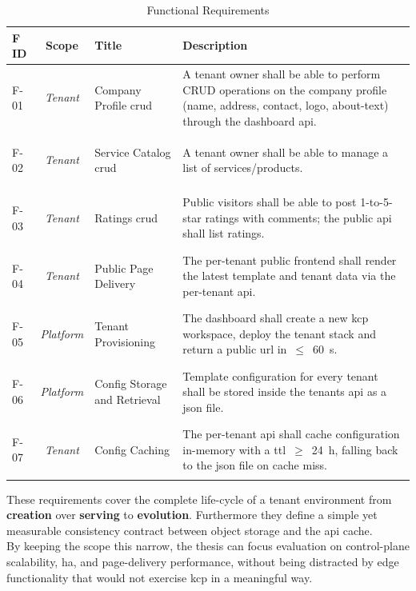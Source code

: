 \documentclass[11pt, a4paper, oneside, listof=totoc]{scrartcl}
\begin{document}
                \begin{table}[H]\label{tab:fr}
                    \centering
                    \renewcommand{\arraystretch}{1.5}
                    \begin{tabular}{lcp{4cm}P{8cm}}
                        \toprule
                        F ID & Scope & Title & Description \\
                        \midrule
                        \hypertarget{f1}{F-01} & \textit{Tenant} & Company Profile \gls{crud} & A tenant owner shall be able to perform CRUD operations on the company profile (name, address, contact, logo, about-text) through the dashboard \gls{api}. \\
                        \hypertarget{f2}{F-02} & \textit{Tenant} & Service Catalog \gls{crud} & A tenant owner shall be able to manage a list of services/products. \\
                        \hypertarget{f3}{F-03} & \textit{Tenant} & Ratings \gls{crud} & Public visitors shall be able to post 1-to-5-star ratings with comments; the public \gls{api} shall list ratings. \\
                        \hypertarget{f4}{F-04} & \textit{Tenant} & Public Page Delivery & The per-tenant public frontend shall render the latest template and tenant data via the per-tenant \gls{api}. \\
                        \hypertarget{f5}{F-05} & \textit{Platform} & Tenant Provisioning & The dashboard shall create a new \gls{kcp} workspace, deploy the tenant stack and return a public \gls{url} in~$\leq$~60~s. \\
                        \hypertarget{f6}{F-06} & \textit{Platform} & Config Storage and Retrieval & Template configuration for every tenant shall be stored inside the tenants \gls{api} as a \gls{json} file. \\
                        \hypertarget{f7}{F-07} & \textit{Tenant} & Config Caching & The per-tenant \gls{api} shall cache configuration in-memory with a \gls{ttl}~$\geq$~24~h, falling back to the \gls{json} file on cache miss. \\
                        \bottomrule
                    \end{tabular}
                    \caption{Functional Requirements}
                \end{table}

                These requirements cover the complete life-cycle of a tenant environment from
                \textbf{creation} over \textbf{serving} to \textbf{evolution}.
                Furthermore they define a simple yet measurable consistency contract between object
                storage and the \gls{api} cache.
                \\
                By keeping the scope this narrow, the thesis can focus evaluation on control-plane
                scalability, \gls{ha}, and page-delivery performance, without being distracted by
                edge functionality that would not exercise \gls{kcp} in a meaningful way.
\end{document}
